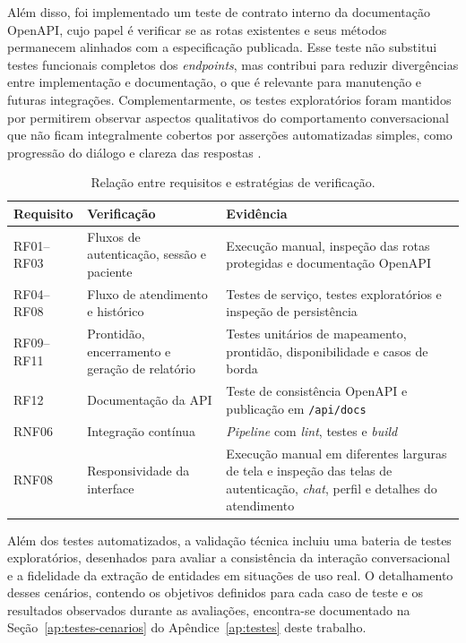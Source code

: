 Além disso, foi implementado um teste de contrato interno da documentação OpenAPI, cujo papel
é verificar se as rotas existentes e seus métodos permanecem alinhados com a especificação
publicada. Esse teste não substitui testes funcionais completos dos \textit{endpoints}, mas
contribui para reduzir divergências entre implementação e documentação, o que é relevante para
manutenção e futuras integrações. Complementarmente, os testes exploratórios foram mantidos por
permitirem observar aspectos qualitativos do comportamento conversacional que não ficam
integralmente cobertos por asserções automatizadas simples, como progressão do diálogo e
clareza das respostas \cite{fowler2018}.

\begin{table}[htb]
\centering
\caption{Relação entre requisitos e estratégias de verificação.}
\label{tab:plano-testes}
\begin{tabularx}{\textwidth}{p{2.0cm}p{5.2cm}Y}
\hline
Requisito & Verificação & Evidência \\
\hline
RF01--RF03 & Fluxos de autenticação, sessão e paciente & Execução manual, inspeção das rotas protegidas e documentação OpenAPI \\
RF04--RF08 & Fluxo de atendimento e histórico & Testes de serviço, testes exploratórios e inspeção de persistência \\
RF09--RF11 & Prontidão, encerramento e geração de relatório & Testes unitários de mapeamento, prontidão, disponibilidade e casos de borda \\
RF12 & Documentação da API & Teste de consistência OpenAPI e publicação em \texttt{/api/docs} \\
RNF06 & Integração contínua & \textit{Pipeline} com \textit{lint}, testes e \textit{build} \\
RNF08 & Responsividade da interface & Execução manual em diferentes larguras de tela e inspeção das telas de autenticação, \textit{chat}, perfil e detalhes do atendimento \\
\hline
\end{tabularx}
\end{table}

Além dos testes automatizados, a validação técnica incluiu uma bateria de testes exploratórios, desenhados 
para avaliar a consistência da interação conversacional e a fidelidade da extração de entidades em situações de uso real. 
O detalhamento desses cenários, contendo os objetivos definidos para cada caso de teste e os resultados observados 
durante as avaliações, encontra-se documentado na Seção~\ref{ap:testes-cenarios} do Apêndice~\ref{ap:testes} deste trabalho.

